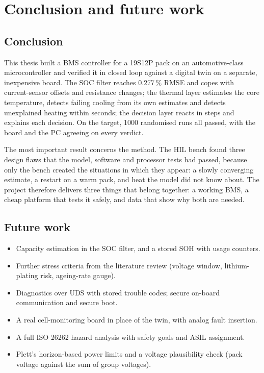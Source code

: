 \chapter{Conclusion and future work}\label{ch:conclusion}

\section{Conclusion}
This thesis built a BMS controller for a 19S12P pack on an automotive-class microcontroller and verified it in closed loop against a digital twin on a separate, inexpensive board. The SOC filter reaches 0.277\,\% RMSE and copes with current-sensor offsets and resistance changes; the thermal layer estimates the core temperature, detects failing cooling from its own estimates and detects unexplained heating within seconds; the decision layer reacts in steps and explains each decision. On the target, 1000 randomised runs all passed, with the board and the PC agreeing on every verdict.

The most important result concerns the method. The HIL bench found three design flaws that the model, software and processor tests had passed, because only the bench created the situations in which they appear: a slowly converging estimate, a restart on a warm pack, and heat the model did not know about. The project therefore delivers three things that belong together: a working BMS, a cheap platform that tests it safely, and data that show why both are needed.

\section{Future work}
\begin{itemize}
  \item Capacity estimation in the SOC filter, and a stored SOH with usage counters.
  \item Further stress criteria from the literature review (voltage window, lithium-plating risk, ageing-rate gauge).
  \item Diagnostics over UDS with stored trouble codes; secure on-board communication and secure boot.
  \item A real cell-monitoring board in place of the twin, with analog fault insertion.
  \item A full ISO 26262 hazard analysis with safety goals and ASIL assignment.
  \item Plett's horizon-based power limits and a voltage plausibility check (pack voltage against the sum of group voltages).
\end{itemize}
